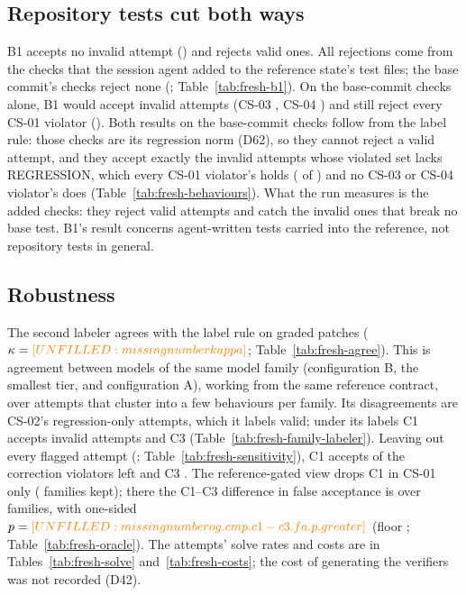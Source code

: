 \subsection{Repository tests cut both ways}
\label{sec:results-b1}
B1 accepts no invalid attempt () and rejects  valid ones. All  rejections come from the  checks that the session agent added to the reference state's test files; the base commit's  checks reject none (; Table~\ref{tab:fresh-b1}). On the base-commit checks alone, B1 would accept  invalid attempts (CS-03 , CS-04 ) and still reject every CS-01 violator (). Both results on the base-commit checks follow from the label rule: those checks are its regression norm (D62), so they cannot reject a valid attempt, and they accept exactly the invalid attempts whose violated set lacks REGRESSION, which every CS-01 violator's holds ( of ) and no CS-03 or CS-04 violator's does (Table~\ref{tab:fresh-behaviours}). What the run measures is the added checks: they reject  valid attempts and catch the  invalid ones that break no base test. B1's result concerns agent-written tests carried into the reference, not repository tests in general.

\subsection{Robustness}
\label{sec:results-robust}
The second labeler agrees with the label rule on  graded patches ($\kappa=\fv{kappa}$; Table~\ref{tab:fresh-agree}). This is agreement between models of the same model family (configuration B, the smallest tier, and configuration A), working from the same reference contract, over attempts that cluster into a few behaviours per family. Its  disagreements are CS-02's regression-only attempts, which it labels valid; under its labels C1 accepts  invalid attempts and C3  (Table~\ref{tab:fresh-family-labeler}). Leaving out every flagged attempt (; Table~\ref{tab:fresh-sensitivity}), C1 accepts  of the correction violators left and C3 . The reference-gated view drops C1 in CS-01 only ( families kept); there the C1--C3 difference in false acceptance is  over  families, with one-sided $p=\fv{og.cmp.c1-c3.fa.p.greater}$ (floor ; Table~\ref{tab:fresh-oracle}). The attempts' solve rates and costs are in Tables~\ref{tab:fresh-solve} and~\ref{tab:fresh-costs}; the cost of generating the verifiers was not recorded (D42).

